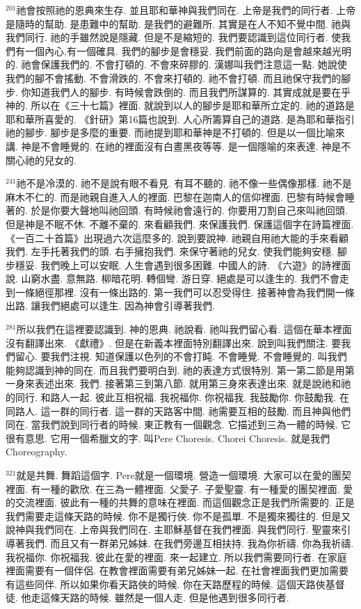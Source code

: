 \documentclass{book}
\begin{document}
$^{201}$祂會按照祂的恩典來生存.
並且耶和華神與我們同在.
上帝是我們的同行者.
上帝是隨時的幫助.
是患難中的幫助.
是我們的避難所.
其實是在人不知不覺中間.
祂與我們同行.
祂的手雖然說是隱藏.
但是不是縮短的.
我們要認識到這位同行者.
使我們有一個內心,有一個確具.
我們的腳步是會穩妥.
我們前面的路向是會越來越光明的.
祂會保護我們的.
不會打頓的.
不會來碎膠的.
漢娜叫我們注意這一點.
她說使我們的腳不會搖動.
不會滑跌的.
不會來打頓的.
祂不會打頓.
而且祂保守我們的腳步.
你知道我們人的腳步.
有時候會跌倒的.
而且我們所謀算的.
其實成就是要在乎神的.
所以在《三十七篇》裡面.
就說到以人的腳步是耶和華所立定的.
祂的道路是耶和華所喜愛的.
《針研》第16篇也說到.
人心所籌算自己的道路.
是為耶和華指引祂的腳步.
腳步是多麼的重要.
而祂提到耶和華神是不打頓的.
但是以一個比喻來講.
神是不會睡覺的.
在祂的裡面沒有白晝黑夜等等.
是一個隱喻的來表達.
神是不關心祂的兒女的.

$^{241}$祂不是冷漠的.
祂不是說有眼不看見.
有耳不聽的.
祂不像一些偶像那樣.
祂不是麻木不仁的.
而是祂親自進入人的裡面.
巴黎在迦南人的信仰裡面.
巴黎有時候會睡著的.
於是你要大聲地叫祂回頭.
有時候祂會遠行的.
你要用刀割自己來叫祂回頭.
但是神是不眠不休.
不離不棄的.
來看顧我們.
來保護我們.
保護這個字在詩篇裡面.
《一百二十首篇》出現過六次這麼多的.
說到要說神.
祂親自用祂大能的手來看顧我們.
左手托著我們的頭.
右手擁抱我們.
來保守著祂的兒女.
使我們能夠安穩.
腳步穩妥.
我們晚上可以安眠.
人生會遇到很多困難.
中國人的詩.
《六遊》的詩裡面說.
山窮水盡.
意無路.
柳暗花明.
轉個彎.
游日穿.
絕處是可以逢生的.
我們不會走到一條絕徑那裡.
沒有一條出路的.
第一我們可以忍受得住.
接著神會為我們開一條出路.
讓我們絕處可以逢生.
因為神會引導著我們.

$^{281}$所以我們在這裡要認識到.
神的恩典.
祂說看.
祂叫我們留心看.
這個在華本裡面沒有翻譯出來.
《獻禮》.
但是在新義本裡面特別翻譯出來.
說到叫我們關注.
要我們留心.
要我們注視.
知道保護以色列的不會打盹.
不會睡覺.
不會睡覺的.
叫我們能夠認識到神的同在.
而且我們要明白到.
祂的表達方式很特別.
第一第二節是用第一身來表述出來.
我們.
接著第三到第八節.
就用第三身來表達出來.
就是說祂和祂的同行.
和路人一起.
彼此互相祝福.
我祝福你.
你祝福我.
我鼓勵你.
你鼓勵我.
在同路人.
這一群的同行者.
這一群的天路客中間.
祂需要互相的鼓勵.
而且神與他們同在.
當我們說到同行者的時候.
東正教有一個觀念.
它描述到三為一體的時候.
它很有意思.
它用一個希臘文的字.
叫Pere Choresis.
Chorei Choresis.
就是我們Choreography.

$^{321}$就是共舞.
舞蹈這個字.
Pere就是一個環境.
營造一個環境.
大家可以在愛的團契裡面.
有一種的歡欣.
在三為一體裡面.
父愛子.
子愛聖靈.
有一種愛的團契裡面.
愛的交流裡面.
彼此有一種的共舞的意味在裡面.
而這個觀念正是我們所需要的.
正是我們需要走這條天路的時候.
你不是獨行俠.
你不是孤單.
不是獨來獨往的.
但是又說神與我們同在.
上帝與我們同在.
主耶穌基督在我們裡面.
與我們同行.
聖靈來引導著我們.
而且又有一群弟兄姊妹.
在我們旁邊互相扶持.
我為你祈禱.
你為我祈禱.
我祝福你.
你祝福我.
彼此在愛的裡面.
來一起建立.
所以我們需要同行者.
在家庭裡面需要有一個伴侶.
在教會裡面需要有弟兄姊妹一起.
在社會裡面我們更加需要有這些同伴.
所以如果你看天路俠的時候.
你在天路歷程的時候.
這個天路俠基督徒.
他走這條天路的時候.
雖然是一個人走.
但是他遇到很多同行者.
\end{document}
